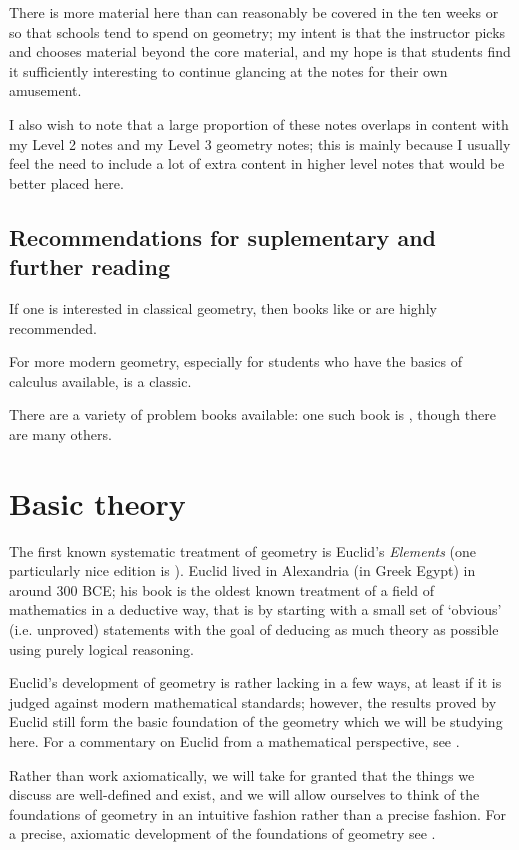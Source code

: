 \documentclass[a4paper]{report}
\theoremstyle{definition}
\begin{document}
  There is more material here than can reasonably be covered in the ten weeks or so that schools tend to spend on geometry; my intent is
  that the instructor picks and chooses material beyond the core material, and my hope is that students find it sufficiently interesting
  to continue glancing at the notes for their own amusement.

  I also wish to note that a large proportion of these notes overlaps in content with my Level 2 notes and my Level 3 geometry notes; this is
  mainly because I usually feel the need to include a lot of extra content in higher level notes that would be better placed here.

  \section*{Recommendations for suplementary and further reading}
  If one is interested in classical geometry, then books like \autocite{sved} or \autocite{coxeterRevisited} are highly recommended.

  For more modern geometry, especially for students who have the basics of calculus available, \autocite{coxeterIntro} is a classic.

  There are a variety of problem books available: one such book is \autocite{challenging}, though there are many others.

  \chapter{Basic theory}
  The first known systematic treatment of geometry is Euclid's \emph{Elements} (one particularly nice
  edition is \autocite{euclid}). Euclid lived in Alexandria (in Greek Egypt) in around 300 BCE; his
  book is the oldest known treatment of a field of mathematics in a deductive way, that is by starting
  with a small set of `obvious' (i.e. unproved) statements with the goal of deducing as much theory
  as possible using purely logical reasoning.

  Euclid's development of geometry is rather lacking in a few ways, at least if it is judged against
  modern mathematical standards; however, the results proved by Euclid still form the basic foundation
  of the geometry which we will be studying here. For a commentary on Euclid from a mathematical perspective,
  see \autocite{hartshorne}.

  Rather than work axiomatically, we will take for granted that the things we discuss
  are well-defined and exist, and we will allow ourselves to think of the foundations of
  geometry in an intuitive fashion rather than a precise fashion. For a precise, axiomatic
  development of the foundations of geometry see \autocite{lee}.
\end{document}
